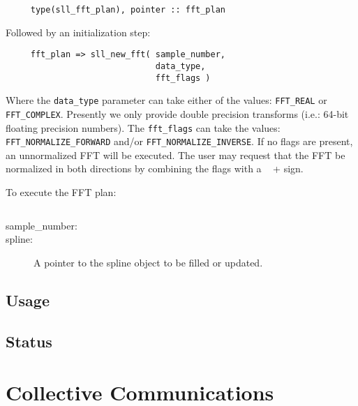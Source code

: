 \documentclass[]{report}   %
\begin{document}
\begin{verbatim}
     type(sll_fft_plan), pointer :: fft_plan
\end{verbatim}
Followed by an initialization step:
\begin{verbatim}
     fft_plan => sll_new_fft( sample_number,  
                              data_type, 
                              fft_flags )
\end{verbatim}
Where the \verb+data_type+ parameter can take either of the values: \verb+FFT_REAL+ or \verb+FFT_COMPLEX+. Presently we only provide double precision transforms (i.e.: 64-bit floating precision numbers).  The \verb+fft_flags+ can take the values: \verb+FFT_NORMALIZE_FORWARD+ and/or \verb+FFT_NORMALIZE_INVERSE+. If no flags are present, an unnormalized FFT will be executed. The user may request that the FFT be normalized in both directions by combining the flags with a \verb+ + + sign.

To execute the FFT plan:

\begin{verbatim}

\end{verbatim}


\begin{description}
\item[sample\_number:] 
\item[spline:]
A pointer to the spline object to be filled or updated.
\end{description}

\subsection{Usage}
\subsection{Status}

\section{Collective Communications}
\end{document}
